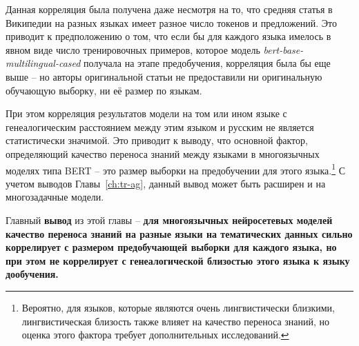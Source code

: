 Данная корреляция была получена даже несмотря на то, что средняя статья в Википедии на разных языках имеет разное число токенов и предложений. Это приводит к предположению о том, что если бы для каждого языка имелось в явном виде число тренировочных примеров, которое модель \textit{bert-base-multilingual-cased} получала на этапе предобучения, корреляция была бы еще выше -- но авторы оригинальной статьи не предоставили ни оригинальную обучающую выборку, ни её размер по языкам. 

При этом корреляция результатов модели на том или ином языке с генеалогическим расстоянием между этим языком и русским не является статистически значимой. Это приводит к выводу, что основной фактор, определяющий качество переноса знаний между языками в многоязычных моделях типа BERT -- это размер выборки на предобучении для этого языка.\footnote{Вероятно, для языков, которые являются очень лингвистически близкими, лингвистическая близость также влияет на качество переноса знаний, но оценка этого фактора требует дополнительных исследований.} С учетом выводов Главы~\ref{ch:tr-ag}, данный вывод может быть расширен и на многозадачные модели.

Главный \textbf{вывод} из этой главы -- \textbf{для многоязычных нейросетевых моделей качество переноса знаний на разные языки на тематических данных сильно коррелирует с размером предобучающей выборки для каждого языка, но при этом не коррелирует с генеалогической близостью этого языка к языку дообучения.}


 
